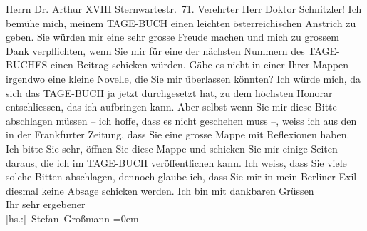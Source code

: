 \begin{ledgroupsized}[t]{13cm}
           \pstart
           \raggedleft{}Herrn\pend
           \pstart
           \noindent{}\raggedleft{}Dr. Arthur \pend
           \pstart
           \noindent{}\raggedleft{} XVIII\pend
           {\bigskip}\pstart
           \noindent{}\raggedleft{}Sternwartestr. 71. \pend
           \pstart\center{}Verehrter Herr Doktor Schnitzler!\pend\pstart
           Ich bemühe mich, meinem TAGE-BUCH einen leichten österreichischen Anstrich
               zu geben. Sie würden mir eine sehr grosse Freude machen und mich zu grossem Dank
               verpflichten, wenn Sie mir für eine der nächsten Nummern des TAGE-BUCHES einen Beitrag schicken würden. Gäbe es nicht in einer Ihrer Mappen irgendwo
               eine kleine Novelle, die Sie mir überlassen könnten? Ich würde mich, da sich das TAGE-BUCH ja jetzt durchgesetzt hat, zu dem höchsten Honorar entschliessen, das ich
               aufbringen kann. Aber selbst wenn Sie mir diese Bitte abschlagen müssen – ich hoffe,
               dass es nicht geschehen muss –, weiss ich aus den \label{K_L02449-1v}\label{K_L02449-1h} in der Frankfurter Zeitung,
               dass Sie eine grosse Mappe mit Reflexionen haben. Ich bitte Sie sehr, öffnen Sie
               diese Mappe und schicken Sie mir einige Seiten daraus, die ich im {\pb}TAGE-BUCH veröffentlichen kann. Ich weiss, dass Sie viele solche Bitten abschlagen,
               dennoch glaube ich, dass Sie mir in mein Berliner
               Exil diesmal keine Absage schicken werden.\pend
           \pstart
           Ich bin mit dankbaren Grüssen{\\[\baselineskip]}Ihr sehr ergebener{\\[\baselineskip]}\spacefill\mbox{{[}hs.:{]} Stefan Großmann}\pend
           \leftskip=0em{}
         
         \endnumbering{}\end{ledgroupsized}  \newcommand{\dateiname}{L02449}\newcommand{\titel}{Stefan Großmann an Arthur Schnitzler, 21. 9. 1925}\newcommand{\editorInnen}{ Martin Anton Müller und Gerd-Hermann Susen}
      